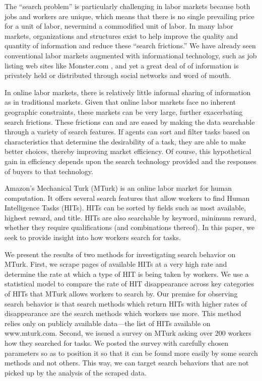 \documentclass{sig-alternate}
\begin{document}
The ``search problem'' is particularly challenging in labor markets
because both jobs and workers are unique, which means that there is no
single prevailing price for a unit of labor, nevermind a commodified
unit of labor. In many labor markets, organizations and structures
exist to help improve the quality and quantity of information and
reduce these ``search frictions.'' We have already seen conventional
labor markets augmented with informational technology, such as job
listing web sites like Monster.com \cite{autor2001wiring}, and yet a
great deal of of information is privately held or distributed through
social networks and word of mouth.

In online labor markets, there is relatively little informal sharing
of information as in traditional markets. Given that online labor
markets face no inherent geographic constraints, these markets can be
very large, further exacerbating search frictions. These frictions can
and are eased by making the data searchable through a variety of
search features.  If agents can sort and filter tasks based on
characteristics that determine the desirability of a task, they are
able to make better choices, thereby improving market efficiency.  Of
course, this hypothetical gain in efficiency depends upon the search
technology provided and the responses of buyers to that technology.

Amazon's Mechanical Turk (MTurk) is an online labor market for human
computation.  It offers several search features that allow workers to
find Human Intelligence Tasks (HITs).  HITs can be sorted by fields
such as most available, highest reward, and title.  HITs are also
searchable by keyword, minimum reward, whether they require
qualifications (and combinations thereof).  In this paper, we seek to
provide insight into how workers search for tasks.

We present the results of two methods for investigating search
behavior on MTurk.  First, we scrape pages of available HITs at a very
high rate and determine the rate at which a type of HIT is being taken
by workers.  We use a statistical model to compare the rate of HIT
disappearance across key categories of HITs that MTurk allows workers
to search by.  Our premise for observing search behavior is that
search methods which return HITs with higher rates of disappearance
are the search methods which workers use more.  This method relies
only on publicly available data---the list of HITs available on
www.mturk.com.  Second, we issued a survey on MTurk asking over 200
workers how they searched for tasks.  We posted the survey with
carefully chosen parameters so as to position it so that it can be
found more easily by some search methods and not others. This way, we
can target search behaviors that are not picked up by the analysis of
the scraped data.
\end{document}
